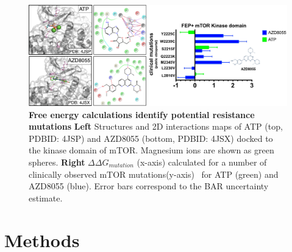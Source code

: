 \documentclass[phd,tocprelim]{cornell}
\begin{document}
\begin{landscape}
	\begin{figure}[p]
		\centering
		\includegraphics[width=1.0\linewidth]{figures/mtor-fig7.pdf}
		\caption[Free energy calculations identify potential resistance mutations]{
			{\bf Free energy calculations identify potential resistance mutations}
			{\bf Left} Structures and 2D interactions maps of ATP (top, PDBID: 4JSP) and AZD8055 (bottom, PDBID: 4JSX) docked to the kinase domain of mTOR. Magnesium ions are shown as green spheres.  {\bf Right} $\Delta \Delta G_{mutation}$ (x-axis) calculated for a number of clinically observed mTOR mutations(y-axis)~\citep{Zehir:Nat.Med.:2017} for ATP (green) and AZD8055 (blue). Error bars correspond to the BAR uncertainty estimate. 
		}
		\label{fig:mtor-figure7}
	\end{figure}
\end{landscape}

\section{Methods}
\end{document}
